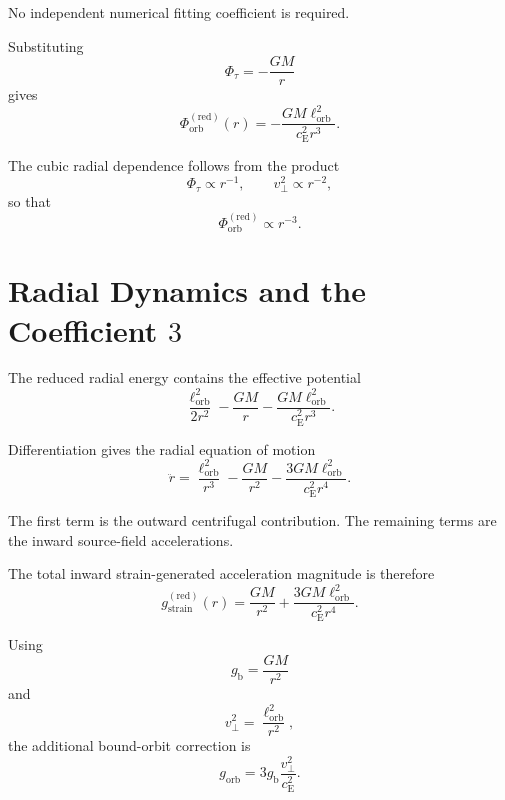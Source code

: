 No independent numerical fitting coefficient is required.

Substituting
\begin{equation}
    \Phi_\tau = -\frac{GM}{r}
\end{equation}
gives
\begin{equation}
    \boxed{ \Phi_{\mathrm{orb}}^{(\mathrm{red})}(r) = - \frac{ GM\ell_{\mathrm{orb}}^2 }{ c_{\mathrm{E}}^2r^3 } }.
\end{equation}

The cubic radial dependence follows from the product
\begin{equation}
    \Phi_\tau \propto r^{-1}, \qquad v_\perp^2 \propto r^{-2},
\end{equation}
so that
\begin{equation}
    \Phi_{\mathrm{orb}}^{(\mathrm{red})} \propto r^{-3}.
\end{equation}

\section{Radial Dynamics and the Coefficient $3$}

The reduced radial energy contains the effective potential
\begin{equation}
    \frac{\ell_{\mathrm{orb}}^2}{2r^2} - \frac{GM}{r} - \frac{ GM\ell_{\mathrm{orb}}^2 }{ c_{\mathrm{E}}^2r^3 }.
\end{equation}

Differentiation gives the radial equation of motion
\begin{equation}
    \ddot{r} = \frac{\ell_{\mathrm{orb}}^2}{r^3} - \frac{GM}{r^2} - \frac{ 3GM\ell_{\mathrm{orb}}^2 }{ c_{\mathrm{E}}^2r^4 }.
\end{equation}

The first term is the outward centrifugal contribution. The remaining terms are the inward source-field accelerations.

The total inward strain-generated acceleration magnitude is therefore
\begin{equation}
    g_{\mathrm{strain}}^{(\mathrm{red})}(r) = \frac{GM}{r^2} + \frac{ 3GM\ell_{\mathrm{orb}}^2 }{ c_{\mathrm{E}}^2r^4 }.
\end{equation}

Using
\begin{equation}
    g_{\mathrm{b}} = \frac{GM}{r^2}
\end{equation}
and
\begin{equation}
    v_\perp^2 = \frac{\ell_{\mathrm{orb}}^2}{r^2},
\end{equation}
the additional bound-orbit correction is
\begin{equation}
    \boxed{ g_{\mathrm{orb}} = 3g_{\mathrm{b}} \frac{v_\perp^2}{c_{\mathrm{E}}^2} }.
\end{equation}

